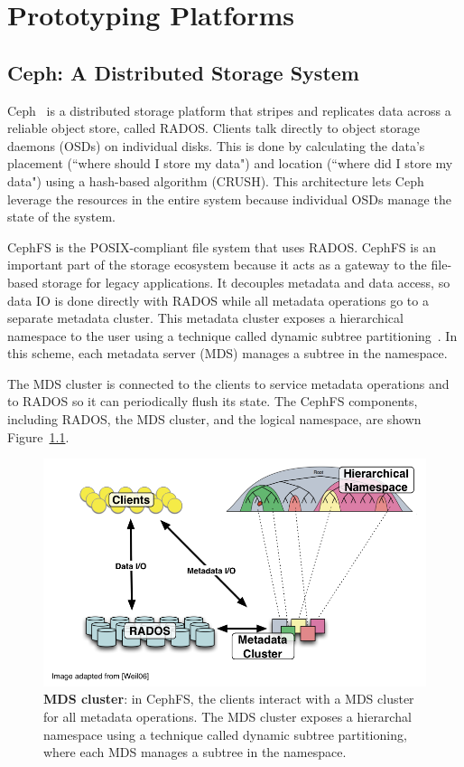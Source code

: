 \chapter{Prototyping Platforms}
\label{chp:prototyping-platform}

\section{Ceph: A Distributed Storage System}
Ceph~\cite{weil:osdi2006-ceph} is a distributed storage platform that stripes
and replicates data across a reliable object store, called RADOS. Clients talk
directly to object storage daemons (OSDs) on individual disks. This is done by
calculating the data's placement (``where should I store my data") and location
(``where did I store my data") using a hash-based algorithm (CRUSH). This
architecture lets Ceph leverage the resources in the entire system because
individual OSDs manage the state of the system. 

CephFS is the POSIX-compliant file system that uses RADOS. CephFS is an
important part of the storage ecosystem because it acts as a gateway to the
file-based storage for legacy applications. It decouples metadata and data
access, so data IO is done directly with RADOS while all metadata operations go
to a separate metadata cluster. This metadata cluster exposes a hierarchical
namespace to the user using a technique called dynamic subtree
partitioning~\cite{weil:sc2004-dyn-metadata}. In this scheme, each metadata
server (MDS) manages a subtree in the namespace. 

The MDS cluster is connected to the clients to service metadata operations and
to RADOS so it can periodically flush its state. The CephFS components,
including RADOS, the MDS cluster, and the logical namespace, are shown
Figure~\ref{ceph-arch}. 

\begin{figure}[tbh]
\centering
	\includegraphics[width=1\textwidth]{./chapters/advancement/figures/ceph-arch.png} 

	\caption{\textbf{MDS cluster}: in CephFS, the clients interact with a
        MDS cluster for all metadata operations. The MDS cluster exposes a hierarchal
        namespace using a technique called dynamic subtree partitioning, where each MDS
        manages a subtree in the namespace.\label{ceph-arch}}

\end{figure}

